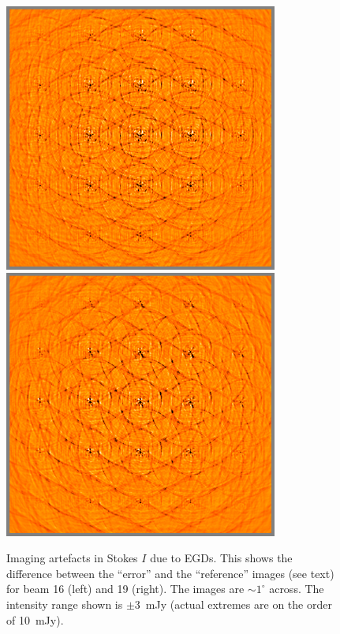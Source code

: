 \documentclass[10pt]{article}
\begin{document}
\begin{figure}
\includegraphics[width=9cm]{diff15uncal}%
\includegraphics[width=9cm]{diff18uncal}%
\caption{\label{fig:diff-uncal}Imaging artefacts in Stokes $I$ due to EGDs. This shows the difference between the ``error'' and the ``reference'' images (see text) for beam 16 (left) and 19 (right). The images are $\sim1^\circ$ across. The intensity range shown is $\pm3$~mJy (actual extremes are on the order of 10~mJy).}
\end{figure}
\end{document}
